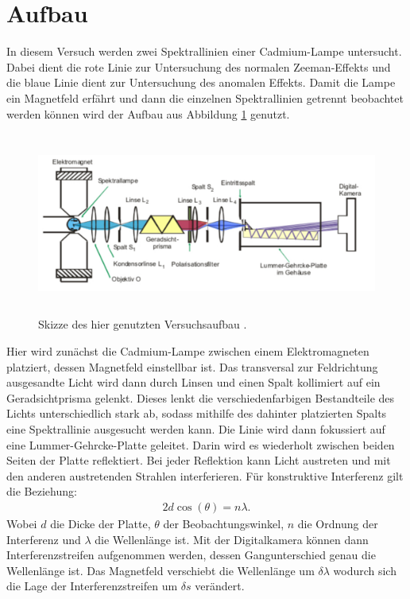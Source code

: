 \section{Aufbau}
\label{sec:aufbau}

In diesem Versuch werden zwei Spektrallinien einer Cadmium-Lampe untersucht. Dabei dient die rote Linie zur Untersuchung des normalen Zeeman-Effekts und die blaue Linie dient zur Untersuchung des anomalen Effekts. Damit die Lampe ein Magnetfeld erfährt und dann die einzelnen Spektrallinien getrennt beobachtet werden können wird der Aufbau aus Abbildung \ref{fig:aufbau} genutzt.
\begin{figure}
  \centering
  \includegraphics[height=6cm]{besuchInDerNacktmullAufzuchtstation/aufbau.pdf}
  \caption{Skizze des hier genutzten Versuchsaufbau \cite{anleitung}.}
  \label{fig:aufbau}
\end{figure}
Hier wird zunächst die Cadmium-Lampe zwischen einem Elektromagneten platziert, dessen Magnetfeld einstellbar ist. Das transversal zur Feldrichtung ausgesandte Licht wird dann durch Linsen und einen Spalt kollimiert auf ein Geradsichtprisma gelenkt. Dieses lenkt die verschiedenfarbigen Bestandteile des Lichts unterschiedlich stark ab, sodass mithilfe des dahinter platzierten Spalts eine Spektrallinie ausgesucht werden kann. Die Linie wird dann fokussiert auf eine Lummer-Gehrcke-Platte geleitet. Darin wird  es wiederholt zwischen beiden Seiten der Platte reflektiert. Bei jeder Reflektion kann Licht austreten und mit den anderen austretenden Strahlen interferieren. Für konstruktive Interferenz gilt
die Beziehung:
\begin{align}
  2 d \cos(\theta) = n \lambda.
\end{align}
Wobei $d$ die Dicke der Platte, $\theta$ der Beobachtungswinkel, $n$ die Ordnung der Interferenz und $\lambda$ die Wellenlänge ist. Mit der Digitalkamera können dann Interferenzstreifen aufgenommen werden, dessen Gangunterschied genau die Wellenlänge ist. Das Magnetfeld verschiebt die Wellenlänge um $\delta \lambda$ wodurch sich die Lage der Interferenzstreifen um $\delta s$ verändert.
